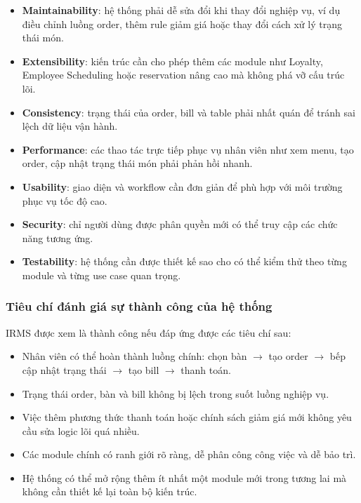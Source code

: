 \documentclass[12pt,a4paper]{article}
\begin{document}
\begin{itemize}
    \item \textbf{Maintainability}: hệ thống phải dễ sửa đổi khi thay đổi nghiệp vụ, ví dụ điều chỉnh luồng order, thêm rule giảm giá hoặc thay đổi cách xử lý trạng thái món.
    \item \textbf{Extensibility}: kiến trúc cần cho phép thêm các module như Loyalty, Employee Scheduling hoặc reservation nâng cao mà không phá vỡ cấu trúc lõi.
    \item \textbf{Consistency}: trạng thái của order, bill và table phải nhất quán để tránh sai lệch dữ liệu vận hành.
    \item \textbf{Performance}: các thao tác trực tiếp phục vụ nhân viên như xem menu, tạo order, cập nhật trạng thái món phải phản hồi nhanh.
    \item \textbf{Usability}: giao diện và workflow cần đơn giản để phù hợp với môi trường phục vụ tốc độ cao.
    \item \textbf{Security}: chỉ người dùng được phân quyền mới có thể truy cập các chức năng tương ứng.
    \item \textbf{Testability}: hệ thống cần được thiết kế sao cho có thể kiểm thử theo từng module và từng use case quan trọng.
\end{itemize}

\subsubsection{Tiêu chí đánh giá sự thành công của hệ thống}

IRMS được xem là thành công nếu đáp ứng được các tiêu chí sau:
\begin{itemize}
    \item Nhân viên có thể hoàn thành luồng chính: chọn bàn $\rightarrow$ tạo order $\rightarrow$ bếp cập nhật trạng thái $\rightarrow$ tạo bill $\rightarrow$ thanh toán.
    \item Trạng thái order, bàn và bill không bị lệch trong suốt luồng nghiệp vụ.
    \item Việc thêm phương thức thanh toán hoặc chính sách giảm giá mới không yêu cầu sửa logic lõi quá nhiều.
    \item Các module chính có ranh giới rõ ràng, dễ phân công công việc và dễ bảo trì.
    \item Hệ thống có thể mở rộng thêm ít nhất một module mới trong tương lai mà không cần thiết kế lại toàn bộ kiến trúc.
\end{itemize}
\end{document}
